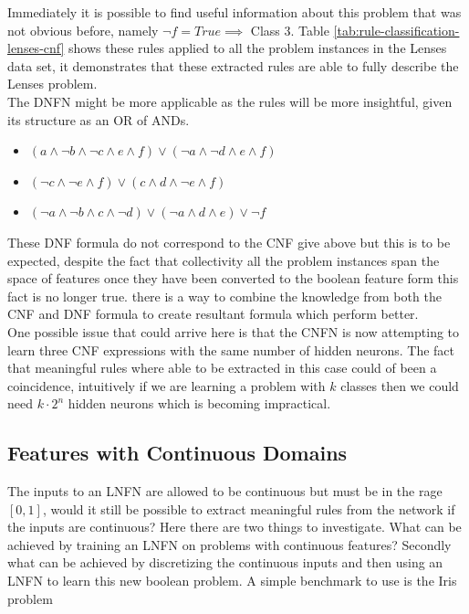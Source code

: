 Immediately it is possible to find useful information about this problem that was not obvious before, namely $\lnot f = True \implies $ Class 3. Table \ref{tab:rule-classification-lenses-cnf} shows these rules applied to all the problem instances in the Lenses data set, it demonstrates that these extracted rules are able to fully describe the Lenses problem.\\

The DNFN might be more applicable as the rules will be more insightful, given its structure as an OR of ANDs.\\

\begin{itemize}
	\item {} $(a \land \lnot b \land \lnot c \land e \land f) \lor (\lnot a \land \lnot d \land e \land f)$
	\item {} $(\lnot c \land \lnot e \land f) \lor (c \land d \land \lnot e \land f)$
	\item {} $(\lnot a \land \lnot b \land c \land \lnot d) \lor (\lnot a \land d \land e) \lor \lnot f$
\end{itemize}

These DNF formula do not correspond to the CNF give above but this is to be expected, despite the fact that collectivity all the problem instances span the space of features once they have been converted to the boolean feature form this fact is no longer true.    there is a way to combine the knowledge from both the CNF and DNF formula to create resultant formula which perform better.\\

One possible issue that could arrive here is that the CNFN is now attempting to learn three CNF expressions with the same number of hidden neurons. The fact that meaningful rules where able to be extracted in this case could of been a coincidence, intuitively if we are learning a problem with $k$ classes then we could need $k \cdot 2^n$ hidden neurons which is becoming impractical.

\subsection{Features with Continuous Domains}
The inputs to an LNFN are allowed to be continuous but must be in the rage $[0, 1]$, would it still be possible to extract meaningful rules from the network if the inputs are continuous? Here there are two things to investigate. What can be achieved by training an LNFN on problems with continuous features? Secondly what can be achieved by discretizing the continuous inputs and then using an LNFN to learn this new boolean problem. A simple benchmark to use is the Iris problem \cite{Lichman:2013}

